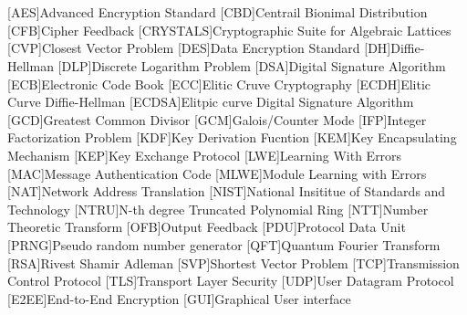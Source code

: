 \cleardoublepage
\chapter*{\listofabbrevname}
{}

\begin{acronym}[mmmmmmm]
	[AES]{Advanced Encryption Standard}
	[CBD]{Centrail Bionimal Distribution}
	[CFB]{Cipher Feedback}
	[CRYSTALS]{Cryptographic Suite for Algebraic Lattices}
	[CVP]{Closest Vector Problem}
	[DES]{Data Encryption Standard}
	[DH]{Diffie-Hellman}
	[DLP]{Discrete Logarithm Problem}
	[DSA]{Digital Signature Algorithm}
	[ECB]{Electronic Code Book}
	[ECC]{Elitic Cruve Cryptography}
	[ECDH]{Elitic Curve Diffie-Hellman}
	[ECDSA]{Elitpic curve Digital Signature Algorithm}
	[GCD]{Greatest Common Divisor}
	[GCM]{Galois/Counter Mode}
	[IFP]{Integer Factorization Problem}
	[KDF]{Key Derivation Fucntion}
	[KEM]{Key Encapsulating Mechanism}
	[KEP]{Key Exchange Protocol}
	[LWE]{Learning With Errors}
	[MAC]{Message Authentication Code}
	[MLWE]{Module Learning with Errors}
	[NAT]{Network Address Translation}
	[NIST]{National Insititue of Standards and Technology}
	[NTRU]{N-th degree Truncated Polynomial Ring}
	[NTT]{Number Theoretic Transform}
	[OFB]{Output Feedback}
	[PDU]{Protocol Data Unit}
	[PRNG]{Pseudo random number generator}
	[QFT]{Quantum Fourier Transform}
	[RSA]{Rivest Shamir Adleman}
	[SVP]{Shortest Vector Problem}
	[TCP]{Transmission Control Protocol}
	[TLS]{Transport Layer Security}
	[UDP]{User Datagram Protocol}
	[E2EE]{End-to-End Encryption}
	[GUI]{Graphical User interface}
\end{acronym}
